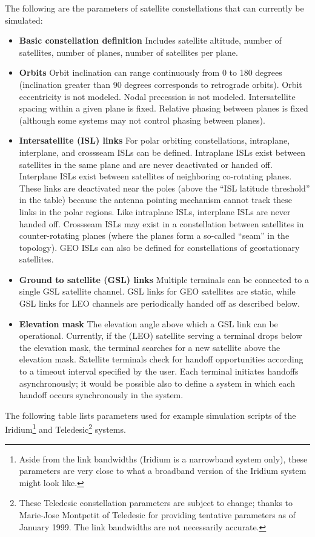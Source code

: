 The following are the parameters of satellite constellations that can currently
be simulated:
\begin{itemize}
        \item {\bf Basic constellation definition} Includes satellite altitude,
number of satellites, number of planes, number of satellites per plane.
        \item {\bf Orbits} Orbit inclination can range continuously
from 0 to 180 degrees (inclination greater than 90 degrees corresponds to
retrograde orbits).  Orbit eccentricity is not modeled.  Nodal precession is 
not modeled.  Intersatellite spacing within a given plane is fixed.  Relative
phasing between planes is fixed (although some systems may not control phasing
between planes).
        \item {\bf Intersatellite (ISL) links} For polar orbiting 
constellations,
intraplane, interplane, and crossseam ISLs can be defined.  Intraplane ISLs
exist between satellites in the same plane and are never deactivated or 
handed off.  Interplane ISLs exist between satellites of neighboring 
co-rotating planes.  These links are deactivated near the poles (above
the ``ISL latitude threshold'' in the table) because the antenna pointing 
mechanism cannot track these links in the polar regions.  Like intraplane ISLs,
interplane ISLs are never handed off.  Crossseam ISLs may exist in a 
constellation between satellites in counter-rotating planes (where the 
planes form a so-called ``seam'' in the topology).   GEO ISLs can also be
defined for constellations of geostationary satellites.
        \item {\bf Ground to satellite (GSL) links}  Multiple terminals
can be connected to a single GSL satellite channel.  GSL links for GEO 
satellites are static, while GSL links for LEO channels are periodically 
handed off as described below.  
        \item {\bf Elevation mask} The elevation angle above which a GSL 
link can be operational.  Currently, if the (LEO) satellite serving a terminal
drops below the elevation mask, the terminal searches for a new satellite
above the elevation mask.  Satellite terminals check for handoff opportunities
according to a timeout interval specified by the user.  Each terminal
initiates handoffs asynchronously; it would be possible also to define
a system in which each handoff occurs synchronously in the system.
\end{itemize}

The following table lists parameters used for example simulation scripts
of the Iridium\footnote{Aside
from the link bandwidths (Iridium is a narrowband system only), these
parameters are very close to what a broadband version of the Iridium system
might look like.}  and Teledesic\footnote{These Teledesic constellation 
parameters are subject to change; 
thanks to Marie-Jose Montpetit of Teledesic for providing
tentative parameters as of January 1999.  The link bandwidths are not
necessarily accurate.} systems.

